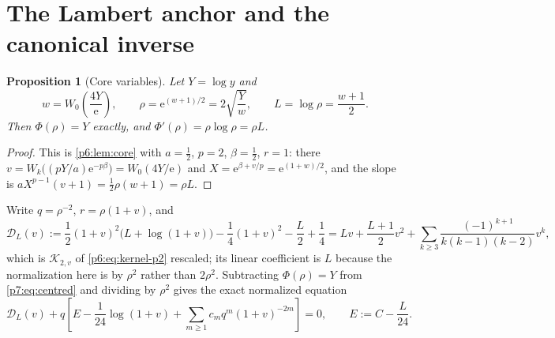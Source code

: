 \documentclass[11pt,a4paper,oneside]{book}
\theoremstyle{plain}
\newtheorem{proposition}[theorem]{Proposition}
\theoremstyle{definition}
\theoremstyle{remark}
\newcommand{\e}{\mathrm{e}}
\newcommand{\Wlam}{W}
\begin{document}
\section{The Lambert anchor and the canonical inverse}
\label{p7:sec:canonical}

\begin{proposition}[Core variables]\label{p7:prop:anchor}
Let $Y=\log y$ and
\begin{equation}\label{p7:eq:core-vars}
 w=\Wlam_0\!\left(\frac{4Y}{\e}\right),
 \qquad
 \rho=\e^{(w+1)/2}=2\sqrt{\frac Yw},
 \qquad
 L=\log\rho=\frac{w+1}2 .
\end{equation}
Then $\Phi(\rho)=Y$ exactly, and $\Phi'(\rho)=\rho\log\rho=\rho L$.
\end{proposition}

\begin{proof}
This is \cref{p6:lem:core} with $a=\tfrac12$, $p=2$, $\beta=\tfrac12$,
$r=1$: there $v=\Wlam_k\bigl((pY/a)\e^{-p\beta}\bigr)=\Wlam_0(4Y/\e)$ and
$X=\e^{\beta+v/p}=\e^{(1+w)/2}$, and the slope is
$aX^{p-1}(v+1)=\tfrac12\rho(w+1)=\rho L$.
\end{proof}

Write $q=\rho^{-2}$, $r=\rho(1+v)$, and
\begin{equation}\label{p7:eq:kernel}
 \mathcal{D}_L(v)
 :=\frac12(1+v)^{2}\bigl(L+\log(1+v)\bigr)-\frac14(1+v)^{2}
   -\frac L2+\frac14
 =Lv+\frac{L+1}2v^{2}+\sum_{k\ge3}\frac{(-1)^{k+1}}{k(k-1)(k-2)}v^{k},
\end{equation}
which is $\mathcal{K}_{2,v}$ of \eqref{p6:eq:kernel-p2} rescaled; its linear
coefficient is $L$ because the normalization here is by $\rho^{2}$ rather
than $2\rho^{2}$.  Subtracting $\Phi(\rho)=Y$ from \eqref{p7:eq:centred} and
dividing by $\rho^{2}$ gives the exact normalized equation
\begin{equation}\label{p7:eq:canonical-implicit}
 \mathcal{D}_L(v)
 +q\left[E-\frac1{24}\log(1+v)
 +\sum_{m\ge1}c_mq^{m}(1+v)^{-2m}\right]=0,
 \qquad
 E:=C-\frac L{24}.
\end{equation}
\end{document}
